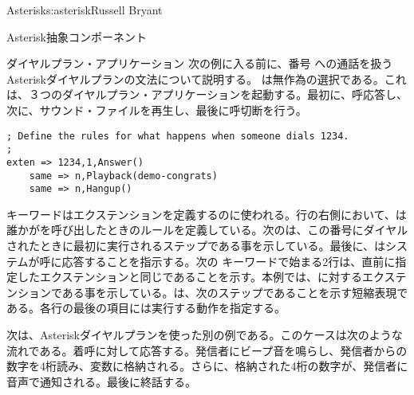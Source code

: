 \begin{aosachapter}{Asterisk}{s:asterisk}{Russell Bryant}
\begin{aosasect1}{Asterisk抽象コンポーネント}
\begin{aosasect2}{ダイヤルプラン・アプリケーション}
次の例に入る前に、番号 への通話を扱うAsteriskダイヤルプランの文法について説明する。 は無作為の選択である。これは、３つのダイヤルプラン・アプリケーションを起動する。最初に、呼応答し、次に、サウンド・ファイルを再生し、最後に呼切断を行う。

\begin{verbatim}
; Define the rules for what happens when someone dials 1234.
;
exten => 1234,1,Answer()
    same => n,Playback(demo-congrats)
    same => n,Hangup()
\end{verbatim}

\noindent {} キーワードはエクステンションを定義するのに使われる。行の右側において、は誰かがを呼び出したときのルールを定義している。次のは、この番号にダイヤルされたときに最初に実行されるステップである事を示している。最後に、はシステムが呼に応答することを指示する。次の キーワードで始まる2行は、直前に指定したエクステンションと同じであることを示す。本例では、に対するエクステンションである事を示している。は、次のステップであることを示す短縮表現である。各行の最後の項目には実行する動作を指定する。

次は、Asteriskダイヤルプランを使った別の例である。このケースは次のような流れである。着呼に対して応答する。発信者にビープ音を鳴らし、発信者からの数字を4桁読み、変数に格納される。さらに、格納された4桁の数字が、発信者に音声で通知される。最後に終話する。


\end{aosasect2}
\end{aosasect1}
\end{aosachapter}

